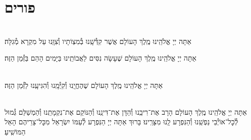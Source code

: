 \documentclass[twoside, openany, parskip=half, 11pt]{book}
\begin{document}
\vfill
\sepline

\chapter[פורים]{ פורים }

\label{purim}

\\
אַתָּה יְיָ אֱלֹהֵֽינוּ מֶֽלֶךְ הָעוֹלָם
אֲשֶׁר קִדְּ֯שָֽׁנוּ בְּ֯מִצְוֹתָיו וְ֯צִוָּֽנוּ עַל מִקְרָא מְ֯גִלָּה׃


אַתָּה יְיָ אֱלֹהֵֽינוּ מֶֽלֶךְ הָעוֹלָם שֶׁעָשָׂה נִסִּים לַאֲבוֹתֵֽינוּ בַּיָּמִים הָהֵם בַּזְּ֯מַן הַזֶּה׃

\\
אַתָּה יְיָ אֱלֹהֵֽינוּ מֶֽלֶךְ הָעוֹלָם שֶׁהֶחֱיָֽנוּ וְ֯קִיְּ֯מָֽנוּ וְ֯הִגִּיעָֽנוּ לַזְּ֯מַן הַזֶּה׃


 \\
אַתָּה יְיָ אֱלֹהֵֽינוּ מֶֽלֶךְ הָעוֹלָם הָרָב אֶת־רִיבֵֽנוּ וְ֯הַדָּן אֶת־דִּינֵֽנוּ וְ֯הַנּוֹקֵם אֶת־נִקְמָתֵֽנוּ וְ֯הַמְשַׁלֵּם גְּ֯מוּל לְ֯כׇל־אוֹיְ֯בֵי נַפְשֵֽׁנוּ וְ֯הַנִּפְרָע לָֽנוּ מִצָּרֵֽינוּ׃ בָּרוּךְ אַתָּה יְיָ הַנִּפְרָע לְ֯עַמּוֹ יִשְׂרָאֵל מִכׇּל־צָרֵיהֶם הָאֵל הַמּוֹשִֽׁיעַ׃

\end{document}
